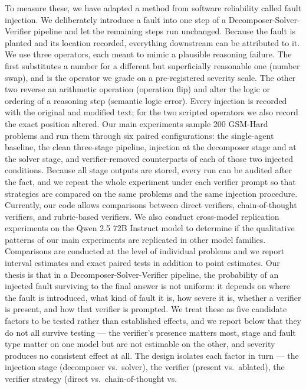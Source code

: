 \documentclass[11pt]{article}
\begin{document}
To measure these, we have adapted a method from software reliability called fault injection. 
We deliberately introduce a fault into one step of a Decomposer-Solver-Verifier
pipeline and let the remaining steps run unchanged. Because the fault is planted and its
location recorded, everything downstream can be attributed to it. We use three operators,
each meant to mimic a plausible reasoning failure. The first substitutes a number for a
different but superficially reasonable one (number swap), and is the operator we grade on a
pre-registered severity scale. The other two reverse an arithmetic operation (operation
flip) and alter the logic or ordering of a reasoning step (semantic logic error). Every
injection is recorded with the original and modified text; for the two scripted operators we
also record the exact position altered.
Our main experiments sample 200 GSM-Hard problems and run them through six paired
configurations: the single-agent baseline, the clean three-stage pipeline, injection at the
decomposer stage and at the solver stage, and verifier-removed counterparts of each of those
two injected conditions. Because all stage outputs are stored, every
run can be audited after the fact, and we repeat the whole experiment under each verifier
prompt so that strategies are compared on the same problems and the same injection
procedure. Currently, our code allows comparisons between direct verifiers,
chain-of-thought verifiers, and rubric-based verifiers. We also conduct cross-model 
replication experiments on the Qwen 2.5 72B Instruct model to determine if the qualitative 
patterns of our main experiments are replicated in other model families. Comparisons are 
conducted at the level of individual problems and we report interval estimates and exact 
paired tests in addition to point estimates.
Our thesis is that in a Decomposer-Solver-Verifier pipeline, the probability of an injected
fault surviving to the final answer is not uniform: it depends on where the fault is
introduced, what kind of fault it is, how severe it is, whether a verifier is present, and
how that verifier is prompted. We treat these as five candidate factors to be tested rather
than established effects, and we report below that they do not all survive testing --- the
verifier's presence matters most, stage and fault type matter on one model but are not
estimable on the other, and severity produces no consistent effect at all.
The design isolates each factor in turn --- the injection stage (decomposer vs.\ solver), the
verifier (present vs.\ ablated), the verifier strategy (direct vs.\ chain-of-thought vs.\
\end{document}
